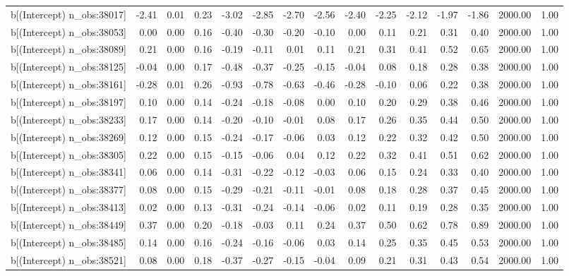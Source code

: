 \begin{table}[ht]
\begin{tabular}{rrrrrrrrrrrrrrr}
  b[(Intercept) n\_obs:38017] & -2.41 & 0.01 & 0.23 & -3.02 & -2.85 & -2.70 & -2.56 & -2.40 & -2.25 & -2.12 & -1.97 & -1.86 & 2000.00 & 1.00 \\ 
  b[(Intercept) n\_obs:38053] & 0.00 & 0.00 & 0.16 & -0.40 & -0.30 & -0.20 & -0.10 & 0.00 & 0.11 & 0.21 & 0.31 & 0.40 & 2000.00 & 1.00 \\ 
  b[(Intercept) n\_obs:38089] & 0.21 & 0.00 & 0.16 & -0.19 & -0.11 & 0.01 & 0.11 & 0.21 & 0.31 & 0.41 & 0.52 & 0.65 & 2000.00 & 1.00 \\ 
  b[(Intercept) n\_obs:38125] & -0.04 & 0.00 & 0.17 & -0.48 & -0.37 & -0.25 & -0.15 & -0.04 & 0.08 & 0.18 & 0.28 & 0.38 & 2000.00 & 1.00 \\ 
  b[(Intercept) n\_obs:38161] & -0.28 & 0.01 & 0.26 & -0.93 & -0.78 & -0.63 & -0.46 & -0.28 & -0.10 & 0.06 & 0.22 & 0.38 & 2000.00 & 1.00 \\ 
  b[(Intercept) n\_obs:38197] & 0.10 & 0.00 & 0.14 & -0.24 & -0.18 & -0.08 & 0.00 & 0.10 & 0.20 & 0.29 & 0.38 & 0.46 & 2000.00 & 1.00 \\ 
  b[(Intercept) n\_obs:38233] & 0.17 & 0.00 & 0.14 & -0.20 & -0.10 & -0.01 & 0.08 & 0.17 & 0.26 & 0.35 & 0.44 & 0.50 & 2000.00 & 1.00 \\ 
  b[(Intercept) n\_obs:38269] & 0.12 & 0.00 & 0.15 & -0.24 & -0.17 & -0.06 & 0.03 & 0.12 & 0.22 & 0.32 & 0.42 & 0.50 & 2000.00 & 1.00 \\ 
  b[(Intercept) n\_obs:38305] & 0.22 & 0.00 & 0.15 & -0.15 & -0.06 & 0.04 & 0.12 & 0.22 & 0.32 & 0.41 & 0.51 & 0.62 & 2000.00 & 1.00 \\ 
  b[(Intercept) n\_obs:38341] & 0.06 & 0.00 & 0.14 & -0.31 & -0.22 & -0.12 & -0.03 & 0.06 & 0.15 & 0.24 & 0.33 & 0.40 & 2000.00 & 1.00 \\ 
  b[(Intercept) n\_obs:38377] & 0.08 & 0.00 & 0.15 & -0.29 & -0.21 & -0.11 & -0.01 & 0.08 & 0.18 & 0.28 & 0.37 & 0.45 & 2000.00 & 1.00 \\ 
  b[(Intercept) n\_obs:38413] & 0.02 & 0.00 & 0.13 & -0.31 & -0.24 & -0.14 & -0.06 & 0.02 & 0.11 & 0.19 & 0.28 & 0.35 & 2000.00 & 1.00 \\ 
  b[(Intercept) n\_obs:38449] & 0.37 & 0.00 & 0.20 & -0.18 & -0.03 & 0.11 & 0.24 & 0.37 & 0.50 & 0.62 & 0.78 & 0.89 & 2000.00 & 1.00 \\ 
  b[(Intercept) n\_obs:38485] & 0.14 & 0.00 & 0.16 & -0.24 & -0.16 & -0.06 & 0.03 & 0.14 & 0.25 & 0.35 & 0.45 & 0.53 & 2000.00 & 1.00 \\ 
  b[(Intercept) n\_obs:38521] & 0.08 & 0.00 & 0.18 & -0.37 & -0.27 & -0.15 & -0.04 & 0.09 & 0.21 & 0.31 & 0.43 & 0.54 & 2000.00 & 1.00 \\ 

\end{tabular}
\end{table}
